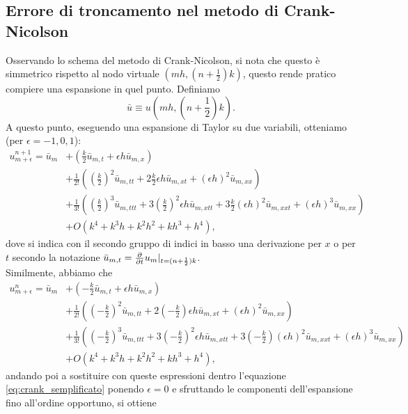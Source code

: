 \documentclass[10pt,a4paper]{article}
\begin{document}
\subsection{Errore di troncamento nel metodo di Crank-Nicolson}
\label{sec:troncamento}

Osservando lo schema del metodo di Crank-Nicolson, si nota che questo è simmetrico rispetto al nodo virtuale $(mh, (n+ \frac{1}{2})k)$, questo rende pratico compiere una espansione in quel punto. Definiamo
\begin{equation}
	\bar{u} \equiv u\left(mh, (n + \frac{1}{2})k\right).
\end{equation}
A questo punto, eseguendo una espansione di Taylor su due variabili, otteniamo (per $\epsilon = -1,0,1$):
\begin{align}
	u_{m+\epsilon}^{n+1} = \bar{u}_m &+ \left( \frac{k}{2}\bar{u}_{m,t} + \epsilon h \bar{u}_{m,x} \right)\\
	&+ \frac{1}{2!}\left(\left(\frac{k}{2}\right)^2 \bar{u}_{m,tt} + 2 \frac{k}{2}\epsilon h \bar{u}_{m,xt}+(\epsilon h)^2 \bar{u}_{m,xx}\right)\\
	&+ \frac{1}{3!}\left(\left(\frac{k}{2}\right)^3 \bar{u}_{m,ttt} + 3\left(\frac{k}{2}\right)^2 \epsilon h \bar{u}_{m,xtt} + 3 \frac{k}{2}(\epsilon h)^2 \bar{u}_{m,xxt}+ (\epsilon h)^3 \bar{u}_{m,xx}\right)\\
	&+O(k^4+k^3h+k^2h^2+kh^3+h^4),
\end{align}
dove si indica con il secondo gruppo di indici in basso una derivazione per $x$ o per $t$ secondo la notazione $\bar{u}_{m,t} = \pdv{}{t}u_m|_{t=(n+\frac{1}{2})k}$.\\Similmente, abbiamo che
\begin{align}
	u_{m+\epsilon}^{n} = \bar{u}_m &+ \left( -\frac{k}{2}\bar{u}_{m,t} + \epsilon h \bar{u}_{m,x} \right)\\
	&+ \frac{1}{2!}\left(\left(-\frac{k}{2}\right)^2 \bar{u}_{m,tt} + 2 \left(-\frac{k}{2}\right)\epsilon h \bar{u}_{m,xt}+(\epsilon h)^2 \bar{u}_{m,xx}\right)\\
	&+ \frac{1}{3!}\left(\left(-\frac{k}{2}\right)^3 \bar{u}_{m,ttt} + 3\left(-\frac{k}{2}\right)^2 \epsilon h \bar{u}_{m,xtt} + 3 \left(-\frac{k}{2}\right)(\epsilon h)^2 \bar{u}_{m,xxt}+ (\epsilon h)^3 \bar{u}_{m,xx}\right)\\
	&+O(k^4+k^3h+k^2h^2+kh^3+h^4),
\end{align}
andando poi a sostituire con queste espressioni dentro l'equazione \eqref{eq:crank_semplificato} ponendo $\epsilon = 0$ e sfruttando le componenti dell'espansione fino all'ordine opportuno, si ottiene
\end{document}
